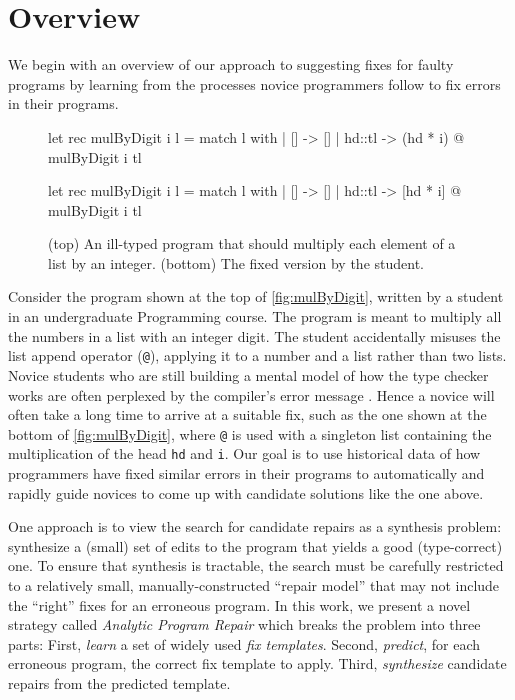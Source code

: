 \section{Overview}
\label{sec:overview}

We begin with an overview of our approach to suggesting fixes for faulty
programs by learning from the processes novice programmers follow
to fix errors in their programs.

\begin{figure}[ht]
\begin{ecode}
let rec mulByDigit i l =
  match l with
  | []     -> []
  | hd::tl -> (hd * i) @ mulByDigit i tl
\end{ecode}

\begin{ecode}
let rec mulByDigit i l =
  match l with
  | []     -> []
  | hd::tl -> [hd * i] @ mulByDigit i tl
\end{ecode}
\caption{(top) An ill-typed \ocaml program that should multiply each element
of a list by an integer. (bottom) The fixed version by the student.}
\label{fig:mulByDigit}
\end{figure}


 Consider the program \mbd shown at the top of
\autoref{fig:mulByDigit}, written by a student in an undergraduate Programming
course. The program is meant to multiply all the numbers in a list with an
integer digit. The student accidentally misuses the list append operator
(\texttt{@}), applying it to a number and a list rather than two lists.
%
Novice students who are still building a mental model of how the type checker
works are often perplexed by the compiler's error message \citep{Munson_2016}.
Hence a novice will often take a long time to arrive at a suitable fix, such as
the one shown at the bottom of \autoref{fig:mulByDigit}, where \texttt{@} is
used with a singleton list containing the multiplication of the head \texttt{hd}
and \texttt{i}.
%
Our goal is to use historical data of how programmers have fixed similar errors
in their programs to automatically and rapidly guide novices to come up with
candidate solutions like the one above.


%
One approach is to view the search for candidate repairs
as a synthesis problem: synthesize a (small) set of edits
to the program that yields a good (\eg type-correct) one.
%
To ensure that synthesis is tractable, the search must be
carefully restricted to a relatively small, manually-constructed
``repair model'' that may not include the ``right'' fixes for
an erroneous program.
%
In this work, we present a novel strategy called
\emph{Analytic Program Repair} which breaks the
problem into three parts:
%
First, \emph{learn} a set of widely used \emph{fix templates}.
%
Second, \emph{predict}, for each erroneous program, the correct fix template to apply.
%
Third, \emph{synthesize} candidate repairs from the predicted template.

